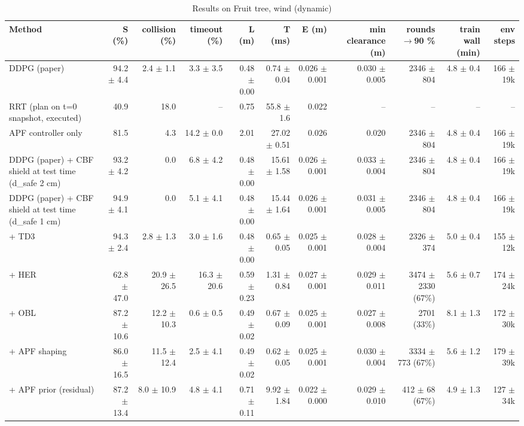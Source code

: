 \begin{table}[t]
\centering
\caption{Results on Fruit tree, wind (dynamic)}
\label{tab:main_wind}
\small
\begin{tabular}{lrrrrrrrrrr}
\toprule
Method & S (\%) & collision (\%) & timeout (\%) & L (m) & T (ms) & E (m) & min clearance (m) & rounds$\rightarrow$90 \% & train wall (min) & env steps \\
\midrule
DDPG (paper) & 94.2 $\pm$ 4.4 & 2.4 $\pm$ 1.1 & 3.3 $\pm$ 3.5 & 0.48 $\pm$ 0.00 & 0.74 $\pm$ 0.04 & 0.026 $\pm$ 0.001 & 0.030 $\pm$ 0.005 & 2346 $\pm$ 804 & 4.8 $\pm$ 0.4 & 166 $\pm$ 19k \\
RRT (plan on t=0 snapshot, executed) & 40.9 & 18.0 & -- & 0.75 & 55.8 $\pm$ 1.6 & 0.022 & -- & -- & -- & -- \\
APF controller only & 81.5 & 4.3 & 14.2 $\pm$ 0.0 & 2.01 & 27.02 $\pm$ 0.51 & 0.026 & 0.020 & 2346 $\pm$ 804 & 4.8 $\pm$ 0.4 & 166 $\pm$ 19k \\
DDPG (paper) + CBF shield at test time (d\_safe 2 cm) & 93.2 $\pm$ 4.2 & 0.0 & 6.8 $\pm$ 4.2 & 0.48 $\pm$ 0.00 & 15.61 $\pm$ 1.58 & 0.026 $\pm$ 0.001 & 0.033 $\pm$ 0.004 & 2346 $\pm$ 804 & 4.8 $\pm$ 0.4 & 166 $\pm$ 19k \\
DDPG (paper) + CBF shield at test time (d\_safe 1 cm) & 94.9 $\pm$ 4.1 & 0.0 & 5.1 $\pm$ 4.1 & 0.48 $\pm$ 0.00 & 15.44 $\pm$ 1.64 & 0.026 $\pm$ 0.001 & 0.031 $\pm$ 0.005 & 2346 $\pm$ 804 & 4.8 $\pm$ 0.4 & 166 $\pm$ 19k \\
+ TD3 & 94.3 $\pm$ 2.4 & 2.8 $\pm$ 1.3 & 3.0 $\pm$ 1.6 & 0.48 $\pm$ 0.00 & 0.65 $\pm$ 0.05 & 0.025 $\pm$ 0.001 & 0.028 $\pm$ 0.004 & 2326 $\pm$ 374 & 5.0 $\pm$ 0.4 & 155 $\pm$ 12k \\
+ HER & 62.8 $\pm$ 47.0 & 20.9 $\pm$ 26.5 & 16.3 $\pm$ 20.6 & 0.59 $\pm$ 0.23 & 1.31 $\pm$ 0.84 & 0.027 $\pm$ 0.001 & 0.029 $\pm$ 0.011 & 3474 $\pm$ 2330 (67\%) & 5.6 $\pm$ 0.7 & 174 $\pm$ 24k \\
+ OBL & 87.2 $\pm$ 10.6 & 12.2 $\pm$ 10.3 & 0.6 $\pm$ 0.5 & 0.49 $\pm$ 0.02 & 0.67 $\pm$ 0.09 & 0.025 $\pm$ 0.001 & 0.027 $\pm$ 0.008 & 2701 (33\%) & 8.1 $\pm$ 1.3 & 172 $\pm$ 30k \\
+ APF shaping & 86.0 $\pm$ 16.5 & 11.5 $\pm$ 12.4 & 2.5 $\pm$ 4.1 & 0.49 $\pm$ 0.02 & 0.62 $\pm$ 0.05 & 0.025 $\pm$ 0.001 & 0.030 $\pm$ 0.004 & 3334 $\pm$ 773 (67\%) & 5.6 $\pm$ 1.2 & 179 $\pm$ 39k \\
+ APF prior (residual) & 87.2 $\pm$ 13.4 & 8.0 $\pm$ 10.9 & 4.8 $\pm$ 4.1 & 0.71 $\pm$ 0.11 & 9.92 $\pm$ 1.84 & 0.022 $\pm$ 0.000 & 0.029 $\pm$ 0.010 & 412 $\pm$ 68 (67\%) & 4.9 $\pm$ 1.3 & 127 $\pm$ 34k \\

\end{tabular}
\end{table}
